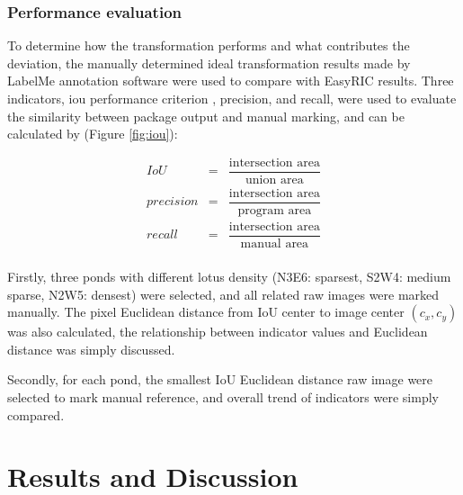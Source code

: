 \documentclass{configs/bmcart}
\begin{document}
\subsubsection*{Performance evaluation}
To determine how the transformation performs and what contributes the deviation, the manually determined ideal transformation results made by LabelMe annotation software were used to compare with EasyRIC results. Three indicators, \acrfull*{iou} performance criterion \cite{everingham_pascal_2010}, precision, and recall, were used to evaluate the similarity between package output and manual marking, and can be calculated by (Figure \ref{fig:iou}): 

$$
\begin{array}{lcl}
  IoU & = & \dfrac{\text{intersection area}}{\text{union area}} \\
  precision & = & \dfrac{\text{intersection area}}{\text{program area}} \\
  recall & = & \dfrac{\text{intersection area}}{\text{manual area}} \\
\end{array}
$$

Firstly, three ponds with different lotus density (N3E6: sparsest, S2W4: medium sparse, N2W5: densest) were selected, and all related raw images were marked manually. The pixel Euclidean distance from IoU center to image center $(c_x, c_y)$ was also calculated, the relationship between indicator values and Euclidean distance was simply discussed.

Secondly, for each pond, the smallest IoU Euclidean distance raw image were selected to mark manual reference, and overall trend of indicators were simply compared.

\section*{Results and Discussion}
\end{document}

